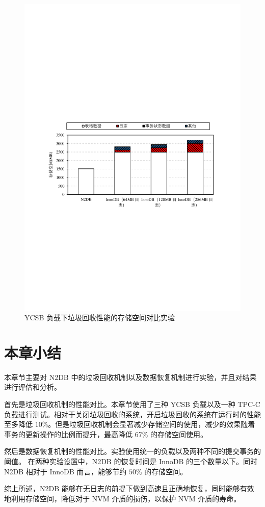 \begin{figure}
    \centering
    \includegraphics[width=15cm, trim={1cm 9cm 1cm 10cm}]{figures/recovery-storage.pdf}
    \caption{YCSB 负载下垃圾回收性能的存储空间对比实验}
    \label{fig:recovery-storage-ycsb}
\end{figure}



\section{本章小结}

本章节主要对 N2DB 中的垃圾回收机制以及数据恢复机制进行实验，并且对结果进行评估和分析。

首先是垃圾回收机制的性能对比。本章节使用了三种 YCSB 负载以及一种 TPC-C 负载进行测试。相对于关闭垃圾回收的系统，开启垃圾回收的系统在运行时的性能至多降低 $10\%$。但是垃圾回收机制会显著减少存储空间的使用，减少的效果随着事务的更新操作的比例而提升，最高降低 $67\%$ 的存储空间使用。

然后是数据恢复机制的性能对比。实验使用统一的负载以及两种不同的提交事务的阈值。
在两种实验设置中，N2DB 的恢复时间是 InnoDB 的三个数量以下。同时 N2DB 相对于 InnoDB 而言，能够节约 $50\%$ 的存储空间。

综上所述，N2DB 能够在无日志的前提下做到高速且正确地恢复，同时能够有效地利用存储空间，降低对于 NVM 介质的损伤，以保护 NVM 介质的寿命。

